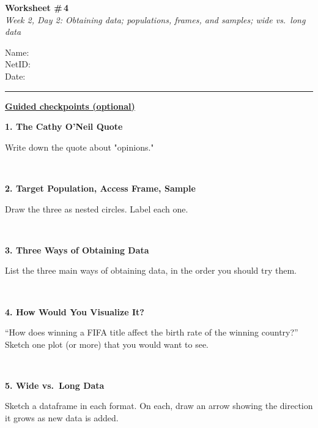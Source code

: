 \documentclass[11pt]{article}
\newcommand{\blankspace}[1]{%
  \vspace{0.3em}
  \begin{minipage}[t][#1][t]{\linewidth}
  \end{minipage}
  \vspace{0.3em}
}
\newcommand{\guidedopen}[4]{%
  \noindent\textbf{#1}\\[0.18em]
  \noindent
  \begin{minipage}[t]{0.485\textwidth}
    #2
    \blankspace{#3}
  \end{minipage}
  \hfill
  \begin{minipage}[t]{0.485\textwidth}
    \blankspace{#4}
  \end{minipage}
  \\[0.4em]
}
\begin{document}
\RaggedRight

\noindent
\begin{minipage}[t]{0.55\textwidth}
  \vspace{0pt}
  {\LARGE \textbf{Worksheet \#\,4}} \\[0.18em]
  {\large \textit{Week 2, Day 2: Obtaining data; populations, frames, and samples; wide vs.\ long data}}
\end{minipage}
\hfill
\begin{minipage}[t]{0.40\textwidth}
  \vspace{0pt}
  \small
  Name: \underline{\hspace{4.5cm}} \\[0.35em]
  NetID: \underline{\hspace{4.3cm}} \\[0.35em]
  Date: \underline{\hspace{4.4cm}} \\
\end{minipage}

\vspace{0.6em}
\noindent\rule{\linewidth}{0.6pt}
\vspace{0.1em}

\noindent\underline{\textbf{Guided checkpoints (optional)}}
\vspace{0.8em}

\guidedopen{1. The Cathy O'Neil Quote}{
Write down the quote about "opinions."
}{4.0cm}{4.8cm}

\vfill

\guidedopen{2. Target Population, Access Frame, Sample}{
Draw the three as nested circles. Label each one.
}{4.3cm}{5.2cm}

\vfill

\guidedopen{3. Three Ways of Obtaining Data}{
List the three main ways of obtaining data, in the order you should try them.
}{3.4cm}{4.2cm}

\vfill

\newpage

\guidedopen{4. How Would You Visualize It?}{
``How does winning a FIFA title affect the birth rate of the winning country?'' Sketch one plot (or more) that you would want to see.
}{3.6cm}{4.6cm}

\vfill

\guidedopen{5. Wide vs.\ Long Data}{
Sketch a dataframe in each format. On each, draw an arrow showing the direction it grows as new data is added.
}{4.0cm}{5.0cm}

\vfill
\end{document}
